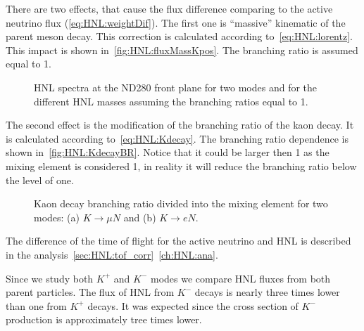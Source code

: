 \documentclass[../main.tex]{subfiles}
\begin{document}
There are two effects, that cause the flux difference comparing to the active neutrino flux (\autoref{eq:HNL:weightDif}). The first one is ``massive'' kinematic of the parent meson decay. This correction is calculated according to~\autoref{eq:HNL:lorentz}. This impact is shown in~\autoref{fig:HNL:fluxMassKpos}. The branching ratio is assumed equal to 1.
\begin{figure}[!ht]
    \begin{minipage}{0.49\linewidth}
    \end{minipage}
    \hfill
    \begin{minipage}{0.49\linewidth}
    \end{minipage}
    \caption{HNL spectra at the ND280 front plane for two modes and for the different HNL masses assuming the branching ratios equal to 1.}
    \label{fig:HNL:fluxMassKpos}
\end{figure}

The second effect is the modification of the branching ratio of the kaon decay. It is calculated according to~\autoref{eq:HNL:Kdecay}. The branching ratio dependence is shown in~\autoref{fig:HNL:KdecayBR}. Notice that it could be larger then 1 as the mixing element is considered 1, in reality it will reduce the branching ratio below the level of one.
\begin{figure}[!ht]
    \begin{minipage}[!ht]{0.49\linewidth}
    \end{minipage}
    \hfill
    \begin{minipage}[!ht]{0.49\linewidth}
    \end{minipage}
    \caption{Kaon decay branching ratio divided into the mixing element for two modes: (a) $K\to \mu N$ and (b) $K\to eN$.}
    \label{fig:HNL:KdecayBR}
\end{figure}

The difference of the time of flight for the active neutrino and HNL is described in the analysis~\autoref{sec:HNL:tof_corr}~\autoref{ch:HNL:ana}.

Since we study both $K^+$ and $K^-$ modes we compare HNL fluxes from both parent particles. The flux of HNL from $K^-$ decays is nearly three times lower than one from $K^+$ decays. It was expected since the cross section of $K^-$ production is approximately  tree times lower.
\end{document}
